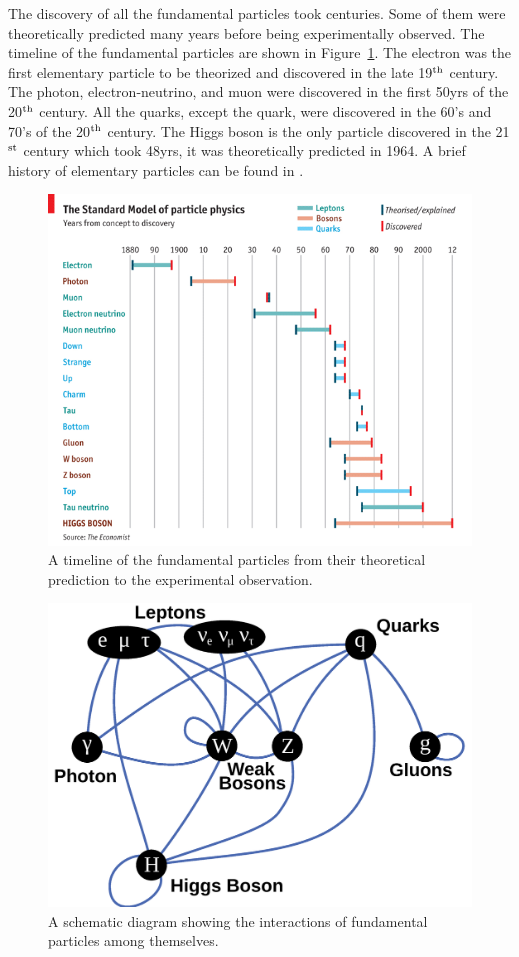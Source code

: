 The discovery of all the fundamental particles took centuries. Some of them were 
theoretically predicted many years before being experimentally observed.
The timeline of the fundamental particles are shown in Figure~\ref{fig:particle_timeline}. 
The electron was the first elementary particle to
be theorized and discovered in the late 19$^{\rm{th}}$ century. The photon, electron-neutrino,
and muon were discovered in the first 50\unit{yrs} of the 20$^{\rm{th}}$ century. All the quarks, 
except the \PQt quark, were discovered in the 60's and 70's of the 20$^{\rm{th}}$ century. The
Higgs boson is the only particle discovered in the 21$^{\rm{st}}$ century which took 48\unit{yrs}, 
it was theoretically predicted in 1964. A brief history of elementary particles 
can be found in \cite{Griffiths:111880}.
\begin{figure}
  \begin{center}
  \includegraphics[width=0.75\linewidth]{Theory/Image/particle_timeline.png}
	  \caption{A timeline of the fundamental particles from their theoretical 
	prediction to the experimental observation.}
  \label{fig:particle_timeline}
  \end{center}
\end{figure}

\begin{figure}
  \begin{center}
  \includegraphics[width=0.50\linewidth]{Theory/Image/particle_int.png}
	\caption{A schematic diagram showing the interactions of fundamental 
	particles among themselves\cite{Isildak:2013kfa}.} 
  \label{fig:particle_int}
  \end{center}
\end{figure}

